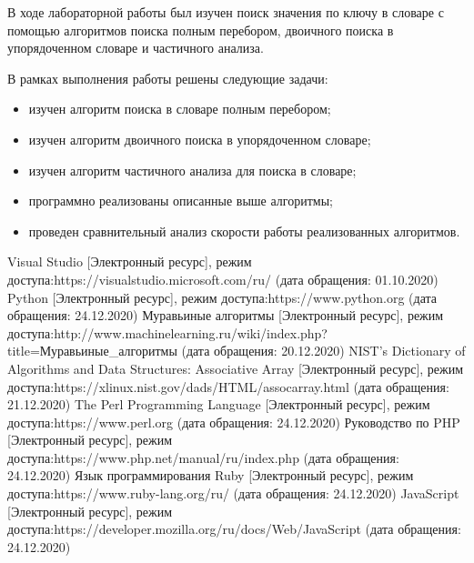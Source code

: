 \documentclass[12pt]{report}
\begin{document}
В ходе лабораторной работы был изучен поиск значения по ключу в словаре с помощью алгоритмов поиска полным перебором, двоичного поиска в упорядоченном словаре и частичного анализа.

В рамках выполнения работы решены следующие задачи:

\begin{itemize}
\item изучен алгоритм поиска в словаре полным перебором;
\item изучен алгоритм двоичного поиска в упорядоченном словаре;
\item изучен алгоритм частичного анализа для поиска в словаре;
\item программно реализованы описанные выше алгоритмы;
\item проведен сравнительный анализ скорости работы реализованных алгоритмов.
\end{itemize}

%

\begin{thebibliography}{3}
	Visual Studio [Электронный ресурс], режим доступа:https://visualstudio.microsoft.com/ru/ (дата обращения: 01.10.2020)
	Python [Электронный ресурс], режим доступа:https://www.python.org (дата обращения: 24.12.2020)
	Муравьиные алгоритмы [Электронный ресурс], режим доступа:http://www.machinelearning.ru/wiki/index.php?title=Муравьиные\_алгоритмы (дата обращения: 20.12.2020)
	NIST’s Dictionary of Algorithms and Data Structures: Associative Array [Электронный ресурс], режим доступа:https://xlinux.nist.gov/dads/HTML/assocarray.html (дата обращения: 21.12.2020)
	The Perl Programming Language [Электронный ресурс], режим доступа:https://www.perl.org (дата обращения: 24.12.2020)
	Руководство по PHP [Электронный ресурс], режим доступа:https://www.php.net/manual/ru/index.php (дата обращения: 24.12.2020)
	Язык программирования Ruby [Электронный ресурс], режим доступа:https://www.ruby-lang.org/ru/ (дата обращения: 24.12.2020)
	JavaScript [Электронный ресурс], режим доступа:https://developer.mozilla.org/ru/docs/Web/JavaScript (дата обращения: 24.12.2020)
	
	
	
\end{thebibliography}
\end{document}
